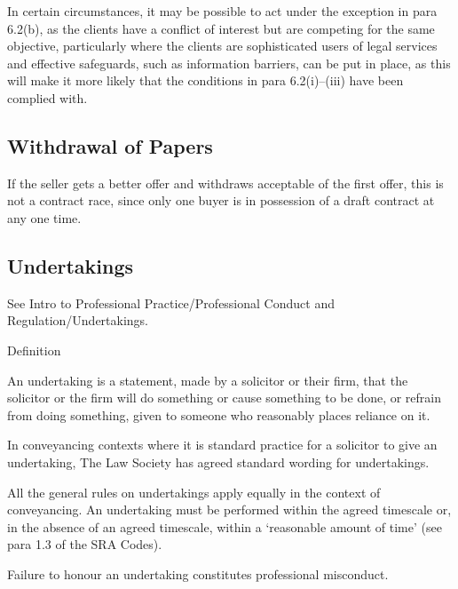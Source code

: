 \documentclass[
]{article}
\newenvironment{env-615494ee-4c11-425d-a24a-676608cc22a4}
{
    \savenotes\tcolorbox[blanker,breakable,left=5pt,borderline west={2pt}{-4pt}{gold}]
}
{
    \endtcolorbox\spewnotes
}
\begin{document}
In certain circumstances, it may be possible to act under the exception
in para 6.2(b), as the clients have a conflict of interest but are
competing for the same objective, particularly where the clients are
sophisticated users of legal services and effective safeguards, such as
information barriers, can be put in place, as this will make it more
likely that the conditions in para 6.2(i)--(iii) have been complied
with.

\hypertarget{withdrawal-of-papers}{%
\subsection{Withdrawal of Papers}\label{withdrawal-of-papers}}

If the seller gets a better offer and withdraws acceptable of the first
offer, this is not a contract race, since only one buyer is in
possession of a draft contract at any one time.

\hypertarget{undertakings}{%
\subsection{Undertakings}\label{undertakings}}

See Intro to Professional Practice/Professional Conduct and
Regulation/Undertakings.

\begin{env-615494ee-4c11-425d-a24a-676608cc22a4}

Definition

An undertaking is a statement, made by a solicitor or their firm, that
the solicitor or the firm will do something or cause something to be
done, or refrain from doing something, given to someone who reasonably
places reliance on it.

\end{env-615494ee-4c11-425d-a24a-676608cc22a4}

In conveyancing contexts where it is standard practice for a solicitor
to give an undertaking, The Law Society has agreed standard wording for
undertakings.

All the general rules on undertakings apply equally in the context of
conveyancing. An undertaking must be performed within the agreed
timescale or, in the absence of an agreed timescale, within a
`reasonable amount of time' (see para 1.3 of the SRA Codes).

Failure to honour an undertaking constitutes professional misconduct.
\end{document}
